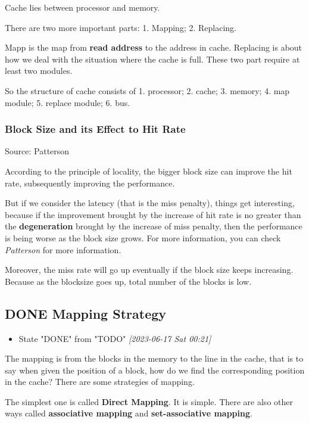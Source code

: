 \documentclass[11pt]{article}
\begin{document}
Cache lies between processor and memory.

There are two more important parts: 1. Mapping; 2. Replacing.

Mapp is the map from \textbf{read address} to the address in cache. Replacing is about how we deal with the situation where the cache is full. These two part require at least two modules.

So the structure of cache consists of 1. processor; 2. cache; 3. memory; 4. map module; 5. replace module; 6. bus. 

\subsubsection{Block Size and its Effect to Hit Rate}
\label{sec:orgde8e712}

Source: Patterson

According to the principle of locality, the bigger block size can improve the hit rate, subsequently improving the performance. 

But if we consider the latency (that is the miss penalty), things get interesting, because if the improvement brought by the increase of hit rate is no greater than the \textbf{degeneration} brought by the increase of miss penalty, then the performance is being worse as the block size grows. For more information, you can check \emph{Patterson} for more information.

Moreover, the miss rate will go up eventually if the block size keeps increasing. Because as the blocksize goes up, total number of the blocks is low.

\subsection{{\bfseries\sffamily DONE} Mapping Strategy}
\label{sec:orgd7ba4a2}
\begin{itemize}
\item State "DONE"       from "TODO"       \textit{[2023-06-17 Sat 00:21]}
\end{itemize}
The mapping is from the blocks in the memory to the line in the cache, that is to say when given the position of a block, how do we find the corresponding position in the cache? There are some strategies of mapping.

The simplest one is called \textbf{Direct Mapping}. It is simple. There are also other ways called \textbf{associative mapping} and \textbf{set-associative mapping}. 
\end{document}
